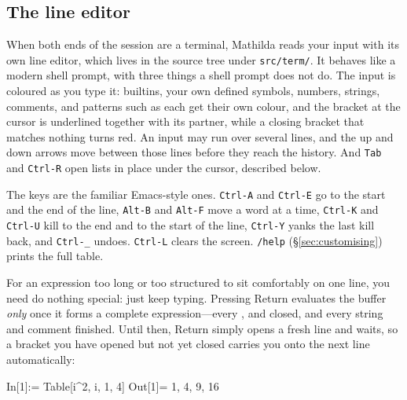 \begin{codepairs}
\end{codepairs}

\subsection{The line editor}
\label{sec:editing}

When both ends of the session are a terminal, Mathilda reads your input with its
own line editor, which lives in the source tree under \texttt{src/term/}. It behaves
like a modern shell prompt, with three things a shell prompt does not do. The input
is coloured as you type it: builtins, your own defined symbols, numbers, strings,
comments, and patterns such as  each get their own colour, and the
bracket at the cursor is underlined together with its partner, while a closing
bracket that matches nothing turns red. An input may run over several lines, and
the up and down arrows move between those lines before they reach the history.
And \texttt{Tab} and \texttt{Ctrl-R} open lists in place under the cursor, described
below.

The keys are the familiar Emacs-style ones. \texttt{Ctrl-A} and \texttt{Ctrl-E} go to
the start and the end of the line, \texttt{Alt-B} and \texttt{Alt-F} move a word
at a time, \texttt{Ctrl-K} and \texttt{Ctrl-U} kill to the end and to the start of
the line, \texttt{Ctrl-Y} yanks the last kill back, and \texttt{Ctrl-\_} undoes.
\texttt{Ctrl-L} clears the screen. \texttt{/help} (\S\ref{sec:customising}) prints
the full table.

For an expression too long or too structured to sit comfortably on one line, you need
do nothing special: just keep typing. Pressing Return
evaluates the buffer \emph{only} once it forms a complete
expression---every \mcode{(}, \mcode{[} and \mcode{\{} closed, and every string and
comment finished. Until then, Return simply opens a fresh line and waits, so a
bracket you have opened but not yet closed carries you onto the next line
automatically:

\begin{shell}
In[1]:= Table[i^2,
{i, 1, 4}]
Out[1]= {1, 4, 9, 16}
\end{shell}

